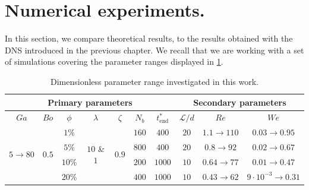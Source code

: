 \section{Numerical experiments. }

In this section, we compare theoretical results, to the results obtained with the DNS introduced in the previous chapter. 
We recall that we are working with a set of simulations covering the parameter ranges displayed in \ref{tab:simulations_recall}. 
\begin{table}[h!]
    \centering
    \caption{Dimensionless parameter range investigated in this work.}
    \begin{tabular}{|ccccccc|ccc|}
        \hline
        \multicolumn{7}{|c}{Primary parameters} & \multicolumn{3}{||c|}{Secondary parameters}\\ \hline
        \multicolumn{1}{|c|}{$Ga$}                               & \multicolumn{1}{c|}{$Bo$}                   & \multicolumn{1}{c|}{$\phi$} & \multicolumn{1}{c|}{$\lambda$}                    & \multicolumn{1}{c|}{$\zeta$}                & \multicolumn{1}{c|}{$N_b$} & $t^*_\text{end}$ & \multicolumn{1}{||c|}{$\mathcal{L}/d$} & \multicolumn{1}{c|}{$Re$}  & $We$   \\ \hline
        \multicolumn{1}{|c|}{\multirow{4}{*}{$5\rightarrow 80$}} & \multicolumn{1}{c|}{\multirow{4}{*}{$0.5$}} & \multicolumn{1}{c|}{$1\%$}  & \multicolumn{1}{c|}{\multirow{4}{*}{$10$ \& $1$}} & \multicolumn{1}{c|}{\multirow{4}{*}{$0.9$}} & \multicolumn{1}{c|}{$160$} & $400$           & \multicolumn{1}{||c|}{$20$}            & \multicolumn{1}{c|}{$1.1\to 110$} & {$0.03\to 0.95$} \\ 
        \multicolumn{1}{|c|}{}                                   & \multicolumn{1}{c|}{}                       & \multicolumn{1}{c|}{$5\%$}  & \multicolumn{1}{c|}{}                             & \multicolumn{1}{c|}{}                       & \multicolumn{1}{c|}{$800$} & $400$           & \multicolumn{1}{||c|}{$20$}            & \multicolumn{1}{c|}{$0.8\to 92$} &  {$0.02\to 0.67$}\\ 
        \multicolumn{1}{|c|}{}                                   & \multicolumn{1}{c|}{}                       & \multicolumn{1}{c|}{$10\%$} & \multicolumn{1}{c|}{}                             & \multicolumn{1}{c|}{}                       & \multicolumn{1}{c|}{$200$} & $1000$           & \multicolumn{1}{||c|}{$10$}            & \multicolumn{1}{c|}{$0.64\to 77$}&  {$0.01\to 0.47$}\\ 
        \multicolumn{1}{|c|}{}                                   & \multicolumn{1}{c|}{}                       & \multicolumn{1}{c|}{$20\%$} & \multicolumn{1}{c|}{}                             & \multicolumn{1}{c|}{}                       & \multicolumn{1}{c|}{$400$} & $1000$           & \multicolumn{1}{||c|}{$10$}            & \multicolumn{1}{c|}{$0.43\to 62$}&  {$9\cdot 10^{-3}\to 0.31$}\\ \hline
        \end{tabular}
    \label{tab:simulations_recall}
\end{table}
